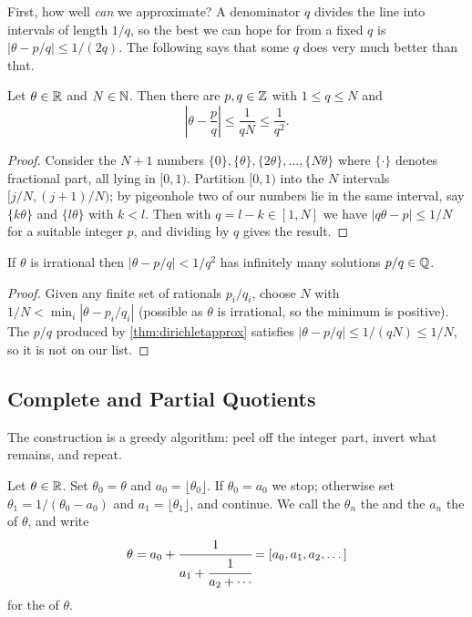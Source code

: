 \documentclass[a4paper]{scrartcl}
\begin{document}
First, how well \emph{can} we approximate? A denominator $q$ divides the line into intervals of length $1/q$, so the best we can hope for from a fixed $q$ is $|\theta - p/q| \leq 1/(2q)$. The following says that some $q$ does very much better than that.

\begin{theorem}[Dirichlet]\label{thm:dirichletapprox}
	Let $\theta \in \mathbb{R}$ and $N \in \mathbb{N}$. Then there are $p, q \in \mathbb{Z}$ with $1 \leq q \leq N$ and
	$$
	\left|\theta - \frac pq\right| \leq \frac1{qN} \leq \frac1{q^2}.
	$$
\end{theorem}
\begin{proof}
	Consider the $N+1$ numbers $\{0\}, \{\theta\}, \{2\theta\}, \dots, \{N\theta\}$ where $\{\cdot\}$ denotes fractional part, all lying in $[0,1)$. Partition $[0,1)$ into the $N$ intervals $[j/N, (j+1)/N)$; by pigeonhole two of our numbers lie in the same interval, say $\{k\theta\}$ and $\{l\theta\}$ with $k < l$. Then with $q = l - k \in [1, N]$ we have $|q\theta - p| \leq 1/N$ for a suitable integer $p$, and dividing by $q$ gives the result.
\end{proof}

\begin{corollary}
	If $\theta$ is irrational then $|\theta - p/q| < 1/q^2$ has infinitely many solutions $p/q \in \mathbb{Q}$.
\end{corollary}
\begin{proof}
	Given any finite set of rationals $p_i/q_i$, choose $N$ with $1/N < \min_i|\theta - p_i/q_i|$ (possible as $\theta$ is irrational, so the minimum is positive). The $p/q$ produced by \autoref{thm:dirichletapprox} satisfies $|\theta - p/q| \leq 1/(qN) \leq 1/N$, so it is not on our list.
\end{proof}

\subsection{Complete and Partial Quotients}

The construction is a greedy algorithm: peel off the integer part, invert what remains, and repeat.

\begin{definition}
	Let $\theta \in \mathbb{R}$. Set $\theta_0 = \theta$ and $a_0 = \lfloor \theta_0 \rfloor$. If $\theta_0 = a_0$ we stop; otherwise set $\theta_1 = 1/(\theta_0 - a_0)$ and $a_1 = \lfloor\theta_1\rfloor$, and continue. We call the $\theta_n$ the  and the $a_n$ the  of $\theta$, and write
	$$
	\theta = a_0 + \cfrac1{a_1 + \cfrac1{a_2 + \cdots}} = [a_0, a_1, a_2, \dots]
	$$
	for the  of $\theta$.
\end{definition}
\end{document}
